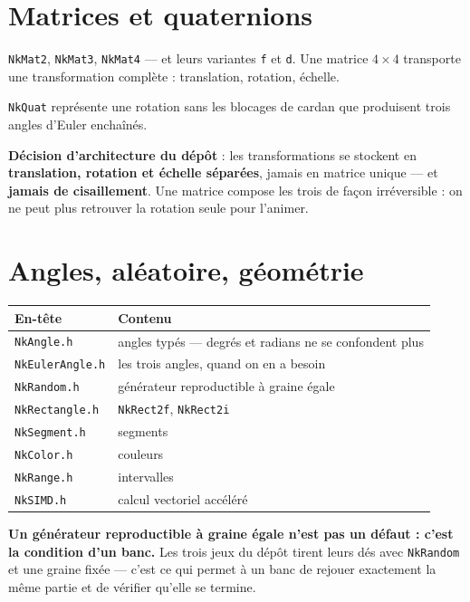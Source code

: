 \section{Matrices et quaternions}

\texttt{NkMat2}, \texttt{NkMat3}, \texttt{NkMat4} --- et leurs variantes
\texttt{f} et \texttt{d}. Une matrice $4\times4$ transporte une transformation
complète : translation, rotation, échelle.

\texttt{NkQuat} représente une rotation sans les blocages de cardan que
produisent trois angles d'Euler enchaînés.

\begin{nkretenir}
\textbf{Décision d'architecture du dépôt} : les transformations se stockent en
\textbf{translation, rotation et échelle séparées}, jamais en matrice unique ---
et \textbf{jamais de cisaillement}. Une matrice compose les trois de façon
irréversible : on ne peut plus retrouver la rotation seule pour l'animer.
\end{nkretenir}

\section{Angles, aléatoire, géométrie}

\begin{center}
\begin{tabular}{@{}ll@{}}
\toprule
\textbf{En-tête} & \textbf{Contenu} \\
\midrule
\texttt{NkAngle.h} & angles typés --- degrés et radians ne se confondent plus \\
\texttt{NkEulerAngle.h} & les trois angles, quand on en a besoin \\
\texttt{NkRandom.h} & générateur reproductible à graine égale \\
\texttt{NkRectangle.h} & \texttt{NkRect2f}, \texttt{NkRect2i} \\
\texttt{NkSegment.h} & segments \\
\texttt{NkColor.h} & couleurs \\
\texttt{NkRange.h} & intervalles \\
\texttt{NkSIMD.h} & calcul vectoriel accéléré \\
\bottomrule
\end{tabular}
\end{center}

\begin{nkretenir}
\textbf{Un générateur reproductible à graine égale n'est pas un défaut : c'est
la condition d'un banc.} Les trois jeux du dépôt tirent leurs dés avec
\texttt{NkRandom} et une graine fixée --- c'est ce qui permet à un banc de
rejouer exactement la même partie et de vérifier qu'elle se termine.
\end{nkretenir}

